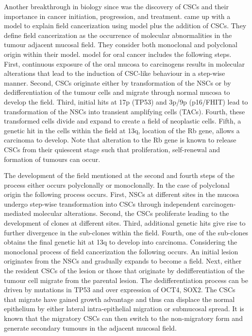 \documentclass[\main/thesis.tex]{subfiles}
\begin{document}
Another breakthrough in biology since \textcite{Slaughter} was the discovery of CSCs and their importance in cancer initiation, progression, and treatment. \textcite{Simple} came up with a model to explain field cancerization using \textcite{Braakhuis} model plus the addition of CSCs. They define field cancerization as the occurrence of molecular abnormalities in the tumour adjacent mucosal field. They consider both monoclonal and polyclonal origin within their model. \textcite{Simple} model for oral cancer includes the following steps. First, continuous exposure of the oral mucosa to carcinogens results in molecular alterations that lead to the induction of CSC-like behaviour in a step-wise manner. Second, CSCs originate either by transformation of the NSCs or by dedifferentiation of the tumour cells and migrate through normal mucosa to develop the field. Third, initial hits at 17p (TP53) and 3p/9p (p16/FHIT) lead to transformation of the NSCs into transient amplifying cells (TACs). Fourth, these transformed cells divide and expand to create a field of neoplastic cells. Fifth, a genetic hit in the cells within the field at 13q, location of the Rb gene, allows a carcinoma to develop. Note that alteration to the Rb gene is known to release CSCs from their quiescent stage such that proliferation, self-renewal and formation of tumours can occur. 

The development of the field mentioned at the second and fourth steps of the process either occurs polyclonally or monoclonally. In the case of polyclonal origin the following process occurs. First, NSCs at different sites in the mucosa undergo step-wise transformation into CSCs through independent carcinogen-mediated molecular alterations. Second, the CSCs proliferate leading to the development of clones at different sites. Third, additional genetic hits give rise to further divergence in the sub-clones within the field. Fourth, one of the sub-clones obtains the final genetic hit at 13q to develop into carcinoma. Considering the monoclonal process of field cancerization the following occurs. An initial lesion originates from the NSCs and gradually expands to become a field. Next, either the resident CSCs of the lesion or those that originate by dedifferentiation of the tumour cell migrate from the parental lesion. The dedifferentiation process can be driven by mutations in TP53 and over expression of OCT4, SOX2. The CSCs that migrate have gained growth advantage and thus can displace the normal epithelium by either lateral intra-epithelial migration or submucosal spread. It is known that the migratory CSCs can then switch to the non-migratory form and generate secondary tumours in the adjacent mucosal field. 
\end{document}
